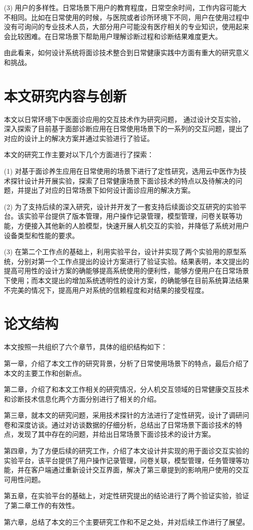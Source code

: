 (3) 用户的多样性。日常场景下用户的教育程度，日常空余时间，工作内容可能大不相同。比如在日常使用的时候，与医院或者诊所环境下不同，用户在使用过程中没有可询问的专业技术人员，大部分用户可能没有医疗相关的专业知识，使用起来会比较困难。在日常场景下帮助用户理解诊断过程和诊断结果难度更大。


由此看来，如何设计系统将面诊技术整合到日常健康实践中方面有重大的研究意义和挑战。



\section{本文研究内容与创新}

本文以日常环境下中医面诊应用的交互技术作为研究问题，
通过设计交互实验，深入探索了目前基于面部诊断应用在日常使用场景下的一系列的交互问题，提出了对应的设计上的解决方案并通过实验进行了验证。

本文的研究工作主要对以下几个方面进行了探索：

(1) 对基于面诊养生应用在日常使用的场景下进行了定性研究，选用云中医作为技术探针设计并开展实验，探索了日常健康场景下面诊技术的特点以及待解决的问题，并提出了对应的日常场景下如何设计面诊应用的解决方案。

(2) 为了支持后续的深入研究，设计并开发了一套支持后续面诊交互研究的实验平台。该实验平台提供了版本管理，用户操作记录管理，模型管理，问卷关联等功能，方便接入其他新的人脸模型，快速开展人机交互的实验，并降低了系统对用户设备类型和性能的要求。

(3) 在第二个工作点的基础上，利用实验平台，设计并实现了两个实验用的原型系统，分别对第一个工作点提出的设计方案进行了验证实验。结果表明，本文提出的提高可用性的设计方案的确能够提高系统使用的便利性，能够方便用户在日常场景下使用；而本文提出的增加系统透明性的设计方案，的确能够在目前系统算法结果不完美的情况下，提高用户对系统的信赖程度和对结果的接受程度。


\section{论文结构}
本文按照一共组织了六个章节，具体的组织结构如下：

第一章，介绍了本文工作的研究背景，分析了日常使用场景下的特点，最后介绍了本文的主要工作和创新点。

第二章，介绍了和本文工作相关的研究情况，分人机交互领域的日常健康交互技术和诊断技术信息化两个方面分别进行了相关的介绍。

第三章，就本文的研究问题，采用技术探针的方法进行了定性研究，设计了调研问卷和深度访谈。通过对访谈数据的仔细分析，总结出了日常场景下面诊技术的特点，发现了其中存在的问题，并给出日常场景下面诊技术的设计方案。

第四章，为了方便后续的研究工作，介绍了本文设计并实现的用于面诊交互实验的实验平台，该平台提供了用户操作记录管理，问卷关联，模型管理，任务管理等功能，并在客户端通过重新设计交互界面，解决了第三章提到的影响用户使用的交互可用性问题。

第五章，在实验平台的基础上，对定性研究提出的结论进行了两个验证实验，验证了第二章工作的有效性。

第六章，总结了本文的三个主要研究工作和不足之处，并对后续工作进行了展望。